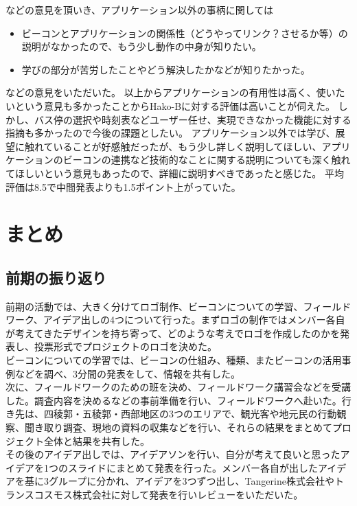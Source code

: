 \documentclass[openany,11pt,papersize]{jsbook}
\begin{document}
などの意見を頂いき、アプリケーション以外の事柄に関しては
\begin{itemize}

\item ビーコンとアプリケーションの関係性（どうやってリンク？させるか等）の説明がなかったので、もう少し動作の中身が知りたい。
\item 学びの部分が苦労したことやどう解決したかなどが知りたかった。

\end{itemize}
などの意見をいただいた。
以上からアプリケーションの有用性は高く、使いたいという意見も多かったことからHako-Bに対する評価は高いことが伺えた。
しかし、バス停の選択や時刻表などユーザー任せ、実現できなかった機能に対する指摘も多かったので今後の課題としたい。
アプリケーション以外では学び、展望に触れていることが好感触だったが、もう少し詳しく説明してほしい、アプリケーションのビーコンの連携など技術的なことに関する説明についても深く触れてほしいという意見もあったので、詳細に説明すべきであったと感じた。
平均評価は8.5で中間発表よりも1.5ポイント上がっていた。



\chapter{まとめ}
\section{前期の振り返り}
前期の活動では、大きく分けてロゴ制作、ビーコンについての学習、フィールドワーク、アイデア出しの4つについて行った。まずロゴの制作ではメンバー各自が考えてきたデザインを持ち寄って、どのような考えでロゴを作成したのかを発表し、投票形式でプロジェクトのロゴを決めた。\\
ビーコンについての学習では、ビーコンの仕組み、種類、またビーコンの活用事例などを調べ、3分間の発表をして、情報を共有した。\\
次に、フィールドワークのための班を決め、フィールドワーク講習会などを受講した。調査内容を決めるなどの事前準備を行い、フィールドワークへ赴いた。行き先は、四稜郭・五稜郭・西部地区の3つのエリアで、観光客や地元民の行動観察、聞き取り調査、現地の資料の収集などを行い、それらの結果をまとめてプロジェクト全体と結果を共有した。\\
その後のアイデア出しでは、アイデアソンを行い、自分が考えて良いと思ったアイデアを1つのスライドにまとめて発表を行った。メンバー各自が出したアイデアを基に3グループに分かれ、アイデアを3つずつ出し、Tangerine株式会社やトランスコスモス株式会社に対して発表を行いレビューをいただいた。
\end{document}
